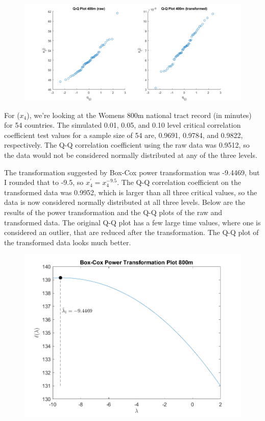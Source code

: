 \begin{center}
    \begin{figure}[H]
        \centering
        \includegraphics[scale=0.4]{./matlab/chapter-4/sol4.36.qq.3.png}
    \end{figure}
\end{center}

For ($x_{4}$), we're looking at the Womens 800m national tract record (in minutes) for 54 countries. The simulated 0.01, 0.05, and 0.10 level critical correlation coefficient test values for a sample size of 54 are, 0.9691, 0.9784, and 0.9822, respectively. The Q-Q correlation coefficient using the raw data was 0.9512, so the data would not be considered normally distributed at any of the three levels.

The transformation suggested by Box-Cox power transformation was -9.4469, but I rounded that to -9.5, so $x_{4}^{\prime} = x_{4}^{-9.5}$.
The Q-Q correlation coefficient on the transformed data was 0.9952, which is larger than all three critical values, so the data is now considered normally distributed at all three levels.
Below are the results of the power transformation and the Q-Q plots of the raw and transformed data.
The original Q-Q plot has a few large time values, where one is considered an outlier, that are reduced after the transformation. The Q-Q plot of the transformed data looks much better.

\begin{center}
    \begin{figure}[H]
        \centering
        \includegraphics[scale=0.6]{./matlab/chapter-4/sol4.36.power.4.png}
    \end{figure}
\end{center}


